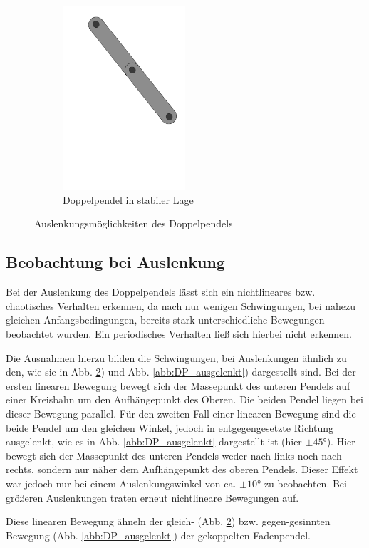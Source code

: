 \documentclass[11pt,a4paper,titlepage, ngerman]{article}
\newcommand{\refabb}[1]{Abb. \ref{abb:#1}}
\begin{document}
\begin{figure}[ht]
				\begin{subfigure}{0.5\textwidth}
					\centering
					\includegraphics[width=0.5\textwidth]{Doppelpendel_stabil.png}
					\caption{Doppelpendel in stabiler Lage}
					\label{abb:DP_stabil}	
				\end{subfigure}
				\caption{Auslenkungsmöglichkeiten des Doppelpendels}
			\end{figure}
		
		\subsection{Beobachtung bei Auslenkung}
		
			Bei der Auslenkung des Doppelpendels lässt sich ein nichtlineares bzw. chaotisches Verhalten erkennen, da nach nur wenigen Schwingungen, bei nahezu gleichen Anfangsbedingungen, bereits stark unterschiedliche Bewegungen beobachtet wurden. Ein periodisches Verhalten ließ sich hierbei nicht erkennen.
		
			Die Ausnahmen hierzu bilden die Schwingungen, bei Auslenkungen ähnlich zu den, wie sie in \refabb{DP_stabil}) und \refabb{DP_ausgelenkt}) dargestellt sind. Bei der ersten linearen Bewegung bewegt sich der Massepunkt des unteren Pendels auf einer Kreisbahn um den Aufhängepunkt des Oberen. Die beiden Pendel liegen bei dieser Bewegung parallel. Für den zweiten Fall einer linearen Bewegung sind die beide Pendel um den gleichen Winkel, jedoch in entgegengesetzte Richtung ausgelenkt, wie es in \refabb{DP_ausgelenkt} dargestellt ist (hier $\pm \ang{45}$). Hier bewegt sich der Massepunkt des unteren Pendels weder nach links noch nach rechts, sondern nur näher dem Aufhängepunkt des oberen Pendels. Dieser Effekt war jedoch nur bei einem Auslenkungswinkel von ca. $\pm \ang{10}$ zu beobachten. Bei größeren Auslenkungen traten erneut nichtlineare Bewegungen auf.
			
			Diese linearen Bewegung ähneln der gleich- (\refabb{DP_stabil}) bzw. gegen-gesinnten Bewegung (\refabb{DP_ausgelenkt}) der gekoppelten Fadenpendel.  
\end{document}
